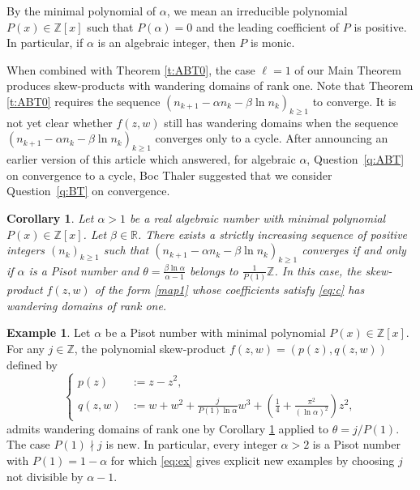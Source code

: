 \documentclass[12pt,centertags,oneside]{amsart}
\newtheorem{corollary}[theorem]{Corollary}
\theoremstyle{definition}
\newtheorem{example}[theorem]{Example}
\newcommand{\R}{\mathbb{R}}
\newcommand{\Z}{\mathbb{Z}}
\begin{document}
By the minimal polynomial of $\alpha$, we mean an irreducible polynomial 
$P(x)\in \Z[x]$ such that $P(\alpha)=0$ and the leading coefficient of $P$ 
is positive. In particular, if $\alpha$ is an algebraic integer, then $P$ is 
monic. 

When combined with Theorem \ref{t:ABT0}, the case $\ell=1$ of our Main 
Theorem produces skew-products with wandering domains of rank one.  Note that 
Theorem \ref{t:ABT0} requires the sequence $(n_{k+1}-\alpha n_k-\beta\ln 
n_k)_{k\geqslant 1}$ to converge. It is not yet clear whether $f(z,w)$ still 
has wandering domains when the sequence $(n_{k+1}-\alpha n_k-\beta\ln 
n_k)_{k\geqslant 1}$ converges only to a cycle. After announcing an earlier 
version of this article which answered, for algebraic $\alpha$, 
Question~\ref{q:ABT} on convergence to a cycle, Boc Thaler suggested that we 
consider Question~\ref{q:BT} on convergence.  


\begin{corollary}\label{c:wandering}
Let $\alpha>1$ be a real algebraic number with minimal polynomial 
$P(x)\in\mathbb{Z}[x]$. Let $\beta\in \R$. There exists a strictly 
increasing sequence of positive integers $(n_k)_{k\geqslant 1}$ such that  
$(n_{k+1}-\alpha n_k-\beta\ln n_k)_{k\geqslant 1}$ converges if and only if 
$\alpha$ is a Pisot number and $\theta=\frac{\beta\ln\alpha}{\alpha-1}$ 
belongs to $\frac{1}{ P(1)}\mathbb{Z}$. In this case, the skew-product 
$f(z,w)$ of the form \eqref{map1} whose coefficients satisfy \eqref{eq:c} 
has wandering domains of rank one. 
\end{corollary}


\begin{example} Let $\alpha$ be a Pisot number with minimal polynomial $P(x)\in \Z[x]$. 
For any $j\in\mathbb{Z}$, the polynomial skew-product $f(z,w)=(p(z),q(z,w))$ 
defined by 
\begin{equation}\label{eq:ex}
\left\{\begin{aligned}
p(z)&:=z-z^2,\\
q(z,w)&:=w+w^2+\frac{j}{P(1)\ln\alpha}w^3+\left(\frac{1}{4}+\frac{\pi^2}{(\ln \alpha)^2}\right) z^2,
\end{aligned}\right.
\end{equation}
admits wandering domains of rank one by Corollary \ref{c:wandering} applied 
to $\theta=j/P(1)$. The case $P(1)\nmid j$ is new. In particular, every 
integer $\alpha>2$ is a Pisot number with $P(1)=1-\alpha$ for which 
\eqref{eq:ex} gives explicit new examples by choosing $j$ not divisible by 
$\alpha-1$. 
\end{example}
\end{document}
